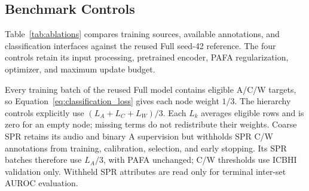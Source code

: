 \subsection{Benchmark Controls}
\label{sec:ablations}
Table~\ref{tab:ablations} compares training sources, available annotations,
and classification interfaces against the reused Full seed-42 reference.
The four controls retain its input processing, pretrained
encoder, PAFA regularization, optimizer, and maximum update budget.

Every training batch of the reused Full model contains eligible A/C/W
targets, so Equation~\ref{eq:classification_loss} gives each node weight
$1/3$. The hierarchy controls explicitly use $(L_A+L_C+L_W)/3$.
Each $L_k$ averages eligible rows and is zero for an empty node; missing
terms do not redistribute their weights. Coarse SPR retains its audio
and binary A supervision but withholds SPR C/W annotations from training,
calibration, selection, and early stopping. Its SPR batches therefore
use $L_A/3$, with PAFA unchanged; C/W thresholds use ICBHI validation only.
Withheld SPR attributes are read only for terminal inter-set AUROC evaluation.

